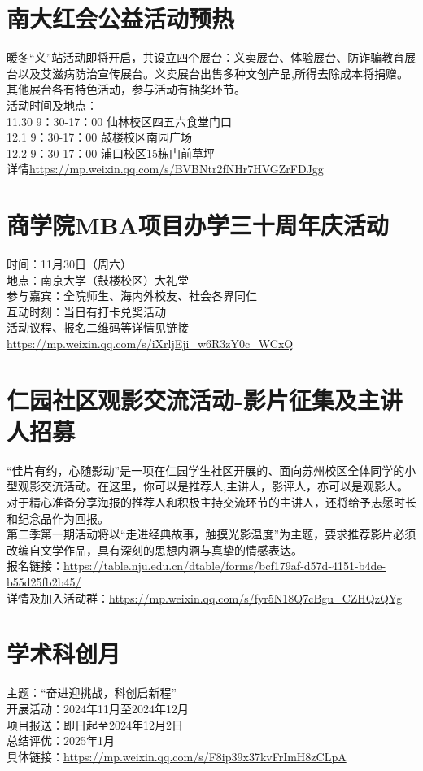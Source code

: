 \documentclass[letterpaper, 12pt]{article}
\begin{document}
\begin{multicols}{2}
\section{南大红会公益活动预热}
暖冬“义”站活动即将开启，共设立四个展台：义卖展台、体验展台、防诈骗教育展台以及艾滋病防治宣传展台。义卖展台出售多种文创产品,所得去除成本将捐赠。其他展台各有特色活动，参与活动有抽奖环节。\\
活动时间及地点：\\
11.30  9：30-17：00  仙林校区四五六食堂门口\\
12.1  9：30-17：00  鼓楼校区南园广场\\
12.2  9：30-17：00  浦口校区15栋门前草坪\\
详情\url{https://mp.weixin.qq.com/s/BVBNtr2fNHr7HVGZrFDJgg}\\

\section{商学院MBA项目办学三十周年庆活动}
时间：11月30日（周六）\\地点：南京大学（鼓楼校区）大礼堂\\参与嘉宾：全院师生、海内外校友、社会各界同仁\\互动时刻：当日有打卡兑奖活动\\活动议程、报名二维码等详情见链接\url{https://mp.weixin.qq.com/s/iXrljEji_w6R3zY0c_WCxQ}
\section{仁园社区观影交流活动-影片征集及主讲人招募}
“佳片有约，心随影动”是一项在仁园学生社区开展的、面向苏州校区全体同学的小型观影交流活动。在这里，你可以是推荐人,主讲人，影评人，亦可以是观影人。对于精心准备分享海报的推荐人和积极主持交流环节的主讲人，还将给予志愿时长和纪念品作为回报。\\
第二季第一期活动将以“走进经典故事，触摸光影温度”为主题，要求推荐影片必须改编自文学作品，具有深刻的思想内涵与真挚的情感表达。\\
报名链接：\url{https://table.nju.edu.cn/dtable/forms/bcf179af-d57d-4151-b4de-b55d25fb2b45/}\\
详情及加入活动群：\url{https://mp.weixin.qq.com/s/fyr5N18Q7cBgu_CZHQzQYg}\\
\section{学术科创月}
主题：“奋进迎挑战，科创启新程”\\
开展活动：2024年11月至2024年12月\\
项目报送：即日起至2024年12月2日\\
总结评优：2025年1月\\
具体链接：\url{https://mp.weixin.qq.com/s/F8ip39x37kvFrImH8zCLpA}\\


\end{multicols}
\end{document}
